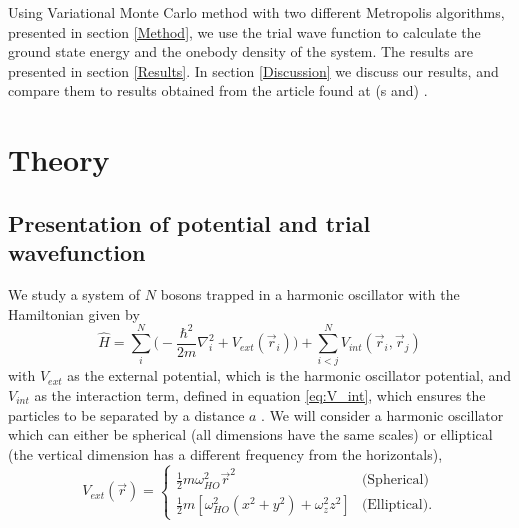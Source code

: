 \documentclass[norsk,a4paper,12pt]{article}
\begin{document}
Using Variational Monte Carlo method with two different Metropolis algorithms, presented in section \ref{Method}, we use the trial wave function to calculate the ground state energy and the onebody density of the system. The results are presented in section \ref{Results}. In section \ref{Discussion} we discuss our results, and compare them to results obtained from the article found at (s \cite{Nilsen} and) \cite{DuBois}.


\section{Theory} \label{Theory}

\subsection{Presentation of potential and trial wavefunction} 

We study a system of $N$ bosons trapped in a harmonic oscillator with the Hamiltonian given by 
\begin{equation}
\hat{H}=\sum_i^N\bigg(-\frac{\hbar^2}{2m}\nabla_i^2+V_{ext}(\vec{r}_i)\bigg)+\sum_{i<j}^NV_{int}(\vec{r}_i,\vec{r}_j)
\label{eq:Hamilton}
\end{equation}
with $V_{ext}$ as the external potential, which is the harmonic oscillator potential,
and $V_{int}$ as the interaction term, defined in equation \ref{eq:V_int}, which ensures the particles to be separated by a distance $a$ . We will consider a harmonic oscillator which can either be spherical (all dimensions have the same scales) or elliptical (the vertical dimension has a different frequency from the horizontals),
\begin{equation}
\label{eq:V_ext}
V_{ext}(\vec{r})=
\begin{cases} 
   \frac{1}{2}m\omega_{HO}^2\vec{r}^2 & \text{(Spherical)} \\
   \frac{1}{2}m[\omega_{HO}^2(x^2 + y^2) + \omega_z^2z^2] & \text{(Elliptical)}.
\end{cases}
\end{equation}
\end{document}
